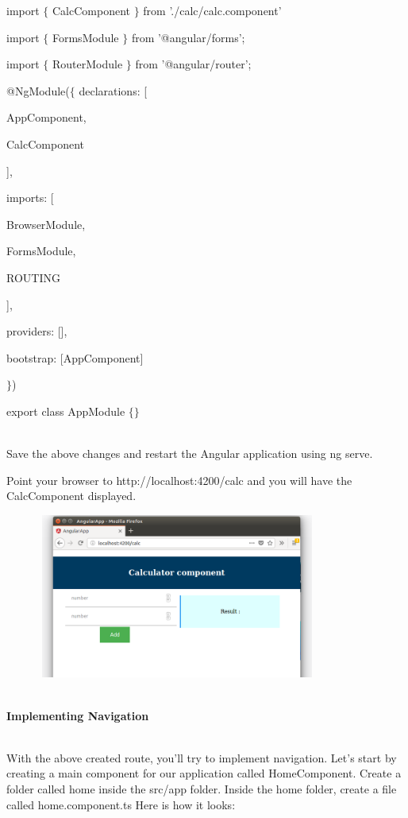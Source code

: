 \documentclass{article}
\begin{document}
\noindent import $\mathrm{\{}$ CalcComponent $\mathrm{\}}$ from './calc/calc.component' 

\noindent import $\mathrm{\{}$ FormsModule $\mathrm{\}}$ from '@angular/forms';

\noindent import $\mathrm{\{}$ RouterModule $\mathrm{\}}$ from '@angular/router';

\noindent @NgModule($\mathrm{\{}$ declarations: [

\noindent AppComponent, 

\noindent CalcComponent

\noindent ],

\noindent imports: [ 

\noindent BrowserModule, 

\noindent FormsModule, 

\noindent ROUTING

\noindent ],

\noindent providers: [],

\noindent bootstrap: [AppComponent]

\noindent $\mathrm{\}}$)

\noindent export class AppModule $\mathrm{\{}$$\mathrm{\}}$

\noindent \\ Save the above changes and restart the Angular application using ng serve.

\noindent Point your browser to http://localhost:4200/calc and you will have the CalcComponent displayed.

\begin{center}
	\noindent \includegraphics*[width=4.48in, height=2.13in]{IMG-05-01}
\end{center}
\newpage
\noindent \\ \textbf{Implementing Navigation}

\noindent 

\noindent \\ With the above created route, you'll try to implement navigation. Let's start by creating a main component for our application called HomeComponent. Create a folder called home inside the src/app folder. Inside the home folder, create a file  called home.component.ts Here is how it looks:
\end{document}
